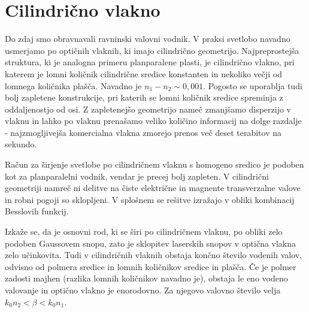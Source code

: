 \section{Cilindrično vlakno}
\label{chap:Cilinder}
Do zdaj smo obravnavali ravninski valovni vodnik. V praksi svetlobo
navadno usmerjamo po optičnih vlaknih, ki imajo cilindrično geometrijo.
Najpreprostejša struktura, ki je analogna primeru planparalene
plasti, je cilindrično vlakno, pri katerem je lomni količnik cilindrične
sredice konstanten in nekoliko večji od lomnega količnika plašča. Navadno je 
$n_1 - n_2 \sim 0,001$. Pogosto se uporablja
tudi bolj zapletene konstrukcije, pri katerih se lomni količnik sredice spreminja z
oddaljenostjo od osi. Z zapletenejšo geometrijo nameč zmanjšamo disperzijo v vlaknu in lahko 
po vlaknu prenašamo veliko količino informacij na dolge razdalje - najzmogljivejša komercialna vlakna
zmorejo prenos več deset terabitov na sekundo. 

Račun za širjenje svetlobe po cilindričnem vlaknu s homogeno sredico
je podoben kot za planparalelni vodnik, vendar je precej bolj
zapleten. V cilindrični geometriji namreč ni delitve na čiste električne in 
magnente transverzalne valove in robni pogoji so sklopljeni. V splošnem se rešitve izražajo 
v obliki kombinacij Besslovih funkcij. 

Izkaže se, da je osnovni rod, ki se širi po cilindričnem vlaknu, po obliki zelo podoben
Gaussovem snopu, zato je sklopitev laserskih snopov v optična vlakna zelo učinkovita.
Tudi v cilindričnih vlaknih obstaja končno število vodenih valov, odvisno od polmera sredice in
lomnih količnikov sredice in plašča. Če je polmer zadosti majhen (razlika lomnih
količnikov navadno je), obstaja le eno vodeno valovanje in optično vlakno je enorodovno. 
Za njegovo valovno število velja $k_{0} n_{2}<\beta<k_{0} n_{1}$. 

